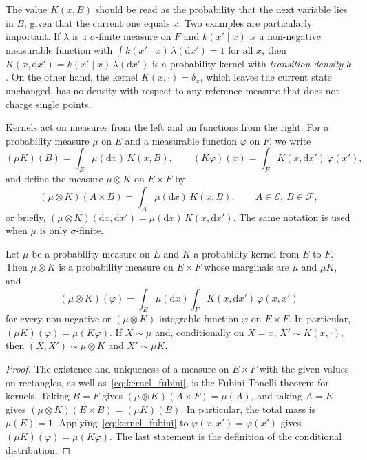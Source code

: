 The value $K(x,B)$ should be read as the probability that the next variable lies in $B$, given that the current one equals $x$. Two examples are particularly important. If $\lambda$ is a $\sigma$-finite measure on $F$ and $k(x'\mid x)$ is a non-negative measurable function with $\int k(x'\mid x)\,\lambda(\mathrm{d}x') = 1$ for all $x$, then $K(x,\mathrm{d}x') = k(x'\mid x)\,\lambda(\mathrm{d}x')$ is a probability kernel with \emph{transition density} $k$. On the other hand, the kernel $K(x,\cdot) = \delta_x$, which leaves the current state unchanged, has no density with respect to any reference measure that does not charge single points.

Kernels act on measures from the left and on functions from the right. For a probability measure $\mu$ on $E$ and a measurable function $\varphi$ on $F$, we write
\begin{equation}
    (\mu K)(B) = \int_E\mu(\mathrm{d}x)\,K(x,B), \qquad
    (K\varphi)(x) = \int_F K(x,\mathrm{d}x')\,\varphi(x'),
\end{equation}
and define the measure $\mu\otimes K$ on $E\times F$ by
\begin{equation}
    (\mu\otimes K)(A\times B) = \int_A\mu(\mathrm{d}x)\,K(x,B), \qquad A\in\mathcal{E},\ B\in\mathcal{F},
\end{equation}
or briefly, $(\mu\otimes K)(\mathrm{d}x,\mathrm{d}x') = \mu(\mathrm{d}x)\,K(x,\mathrm{d}x')$. The same notation is used when $\mu$ is only $\sigma$-finite.

\begin{proposition}
    \label{prop:kernel_composition}
    Let $\mu$ be a probability measure on $E$ and $K$ a probability kernel from $E$ to $F$. Then $\mu\otimes K$ is a probability measure on $E\times F$ whose marginals are $\mu$ and $\mu K$, and
    \begin{equation}
        (\mu\otimes K)(\varphi) = \int_E\mu(\mathrm{d}x)\int_F K(x,\mathrm{d}x')\,\varphi(x,x')
        \label{eq:kernel_fubini}
    \end{equation}
    for every non-negative or $(\mu\otimes K)$-integrable function $\varphi$ on $E\times F$. In particular, $(\mu K)(\varphi) = \mu(K\varphi)$. If $X\sim\mu$ and, conditionally on $X=x$, $X'\sim K(x,\cdot)$, then $(X,X')\sim\mu\otimes K$ and $X'\sim\mu K$.
\end{proposition}
\begin{proof}
    The existence and uniqueness of a measure on $E\times F$ with the given values on rectangles, as well as~\eqref{eq:kernel_fubini}, is the Fubini-Tonelli theorem for kernels. Taking $B=F$ gives $(\mu\otimes K)(A\times F) = \mu(A)$, and taking $A=E$ gives $(\mu\otimes K)(E\times B) = (\mu K)(B)$. In particular, the total mass is $\mu(E)=1$. Applying~\eqref{eq:kernel_fubini} to $\varphi(x,x') = \varphi(x')$ gives $(\mu K)(\varphi) = \mu(K\varphi)$. The last statement is the definition of the conditional distribution.
\end{proof}

